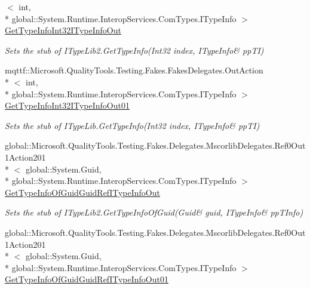 \begin{DoxyCompactItemize}
$<$ int, \\*
global\-::\-System.\-Runtime.\-Interop\-Services.\-Com\-Types.\-I\-Type\-Info $>$ \hyperlink{class_system_1_1_runtime_1_1_interop_services_1_1_com_types_1_1_fakes_1_1_stub_i_type_lib2_afc4e6a7988caf99090527a460809b120}{Get\-Type\-Info\-Int32\-I\-Type\-Info\-Out}
\begin{DoxyCompactList}\small\item\em Sets the stub of I\-Type\-Lib2.\-Get\-Type\-Info(Int32 index, I\-Type\-Info\& pp\-T\-I)\end{DoxyCompactList}\item 
mqttf\-::\-Microsoft.\-Quality\-Tools.\-Testing.\-Fakes.\-Fakes\-Delegates.\-Out\-Action\\*
$<$ int, \\*
global\-::\-System.\-Runtime.\-Interop\-Services.\-Com\-Types.\-I\-Type\-Info $>$ \hyperlink{class_system_1_1_runtime_1_1_interop_services_1_1_com_types_1_1_fakes_1_1_stub_i_type_lib2_a8a9564cc07f25e773848d2dd2773b1d6}{Get\-Type\-Info\-Int32\-I\-Type\-Info\-Out01}
\begin{DoxyCompactList}\small\item\em Sets the stub of I\-Type\-Lib.\-Get\-Type\-Info(Int32 index, I\-Type\-Info\& pp\-T\-I)\end{DoxyCompactList}\item 
global\-::\-Microsoft.\-Quality\-Tools.\-Testing.\-Fakes.\-Delegates.\-Mscorlib\-Delegates.\-Ref0\-Out1\-Action201\\*
$<$ global\-::\-System.\-Guid, \\*
global\-::\-System.\-Runtime.\-Interop\-Services.\-Com\-Types.\-I\-Type\-Info $>$ \hyperlink{class_system_1_1_runtime_1_1_interop_services_1_1_com_types_1_1_fakes_1_1_stub_i_type_lib2_a7cb891c2141b6405b30ee94787b50942}{Get\-Type\-Info\-Of\-Guid\-Guid\-Ref\-I\-Type\-Info\-Out}
\begin{DoxyCompactList}\small\item\em Sets the stub of I\-Type\-Lib2.\-Get\-Type\-Info\-Of\-Guid(Guid\& guid, I\-Type\-Info\& pp\-T\-Info)\end{DoxyCompactList}\item 
global\-::\-Microsoft.\-Quality\-Tools.\-Testing.\-Fakes.\-Delegates.\-Mscorlib\-Delegates.\-Ref0\-Out1\-Action201\\*
$<$ global\-::\-System.\-Guid, \\*
global\-::\-System.\-Runtime.\-Interop\-Services.\-Com\-Types.\-I\-Type\-Info $>$ \hyperlink{class_system_1_1_runtime_1_1_interop_services_1_1_com_types_1_1_fakes_1_1_stub_i_type_lib2_a60d5570ab1f603d9026b4962d930573d}{Get\-Type\-Info\-Of\-Guid\-Guid\-Ref\-I\-Type\-Info\-Out01}

\end{DoxyCompactItemize}
